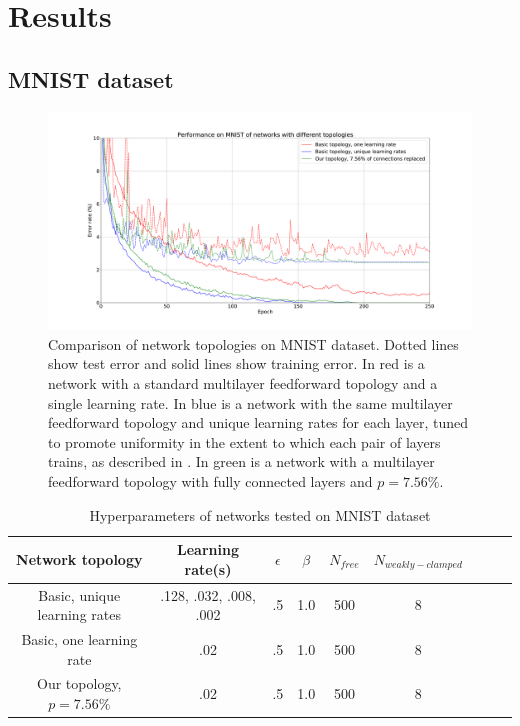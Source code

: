 \documentclass{article}
\begin{document}
\section{Results}
\subsection{MNIST dataset}

\begin{figure}
  \centering
  \includegraphics[width=\textwidth]{figures/MNIST_network_comparison.pdf}
  \caption{Comparison of network topologies on MNIST dataset. Dotted lines show test error and solid lines show training error. In red is a network with a standard multilayer feedforward topology and a single learning rate. In blue is a network with the same multilayer feedforward topology and unique learning rates for each layer, tuned to promote uniformity in the extent to which each pair of layers trains, as described in \cite{scellier17}. In green is a network with a multilayer feedforward topology with fully connected layers and $p=7.56\%$.}
  \label{fig:mnist_comparison}
\end{figure}

\begin{table}
\begin{center}
\begin{tabular}{|c|c|c|c|c|c|c|c|c|}
\hline
Network topology & Learning rate(s) & $\epsilon$ & $\beta$ & $N_{free}$ & $N_{weakly-clamped}$\\\hline\hline
Basic, unique learning rates & .128, .032, .008, .002 & .5 & 1.0 & 500 & 8 \\\hline
Basic, one learning rate & .02 & .5 & 1.0 & 500 & 8  \\\hline
Our topology, $p=7.56\%$ & .02 & .5 & 1.0 & 500 & 8 \\\hline
\end{tabular}
\end{center}
\caption{Hyperparameters of networks tested on MNIST dataset}
\label{table:hyperparameters}
\end{table}
\end{document}
